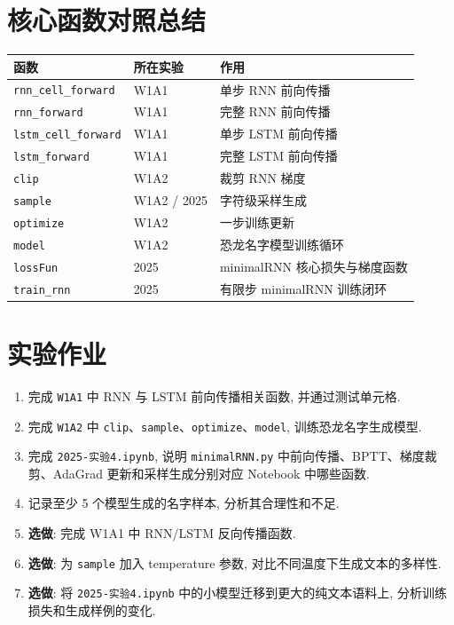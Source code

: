 \documentclass{../../nndlcourse}
\begin{document}
\section{核心函数对照总结}

\begin{center}
\begin{tabular}{|l|l|l|}
\hline
\textbf{函数} & \textbf{所在实验} & \textbf{作用} \\
\hline
\texttt{rnn\_cell\_forward} & W1A1 & 单步 RNN 前向传播 \\
\texttt{rnn\_forward} & W1A1 & 完整 RNN 前向传播 \\
\texttt{lstm\_cell\_forward} & W1A1 & 单步 LSTM 前向传播 \\
\texttt{lstm\_forward} & W1A1 & 完整 LSTM 前向传播 \\
\texttt{clip} & W1A2 & 裁剪 RNN 梯度 \\
\texttt{sample} & W1A2 / 2025 & 字符级采样生成 \\
\texttt{optimize} & W1A2 & 一步训练更新 \\
\texttt{model} & W1A2 & 恐龙名字模型训练循环 \\
\texttt{lossFun} & 2025 & minimalRNN 核心损失与梯度函数 \\
\texttt{train\_rnn} & 2025 & 有限步 minimalRNN 训练闭环 \\
\hline
\end{tabular}
\end{center}


\section{实验作业}
\begin{enumerate}
    \item 完成 \texttt{W1A1} 中 RNN 与 LSTM 前向传播相关函数, 并通过测试单元格.
    \item 完成 \texttt{W1A2} 中 \texttt{clip}、\texttt{sample}、\texttt{optimize}、\texttt{model}, 训练恐龙名字生成模型.
    \item 完成 \texttt{2025-实验4.ipynb}, 说明 \texttt{minimalRNN.py} 中前向传播、BPTT、梯度裁剪、AdaGrad 更新和采样生成分别对应 Notebook 中哪些函数.
    \item 记录至少 5 个模型生成的名字样本, 分析其合理性和不足.
    \item \textbf{选做}: 完成 W1A1 中 RNN/LSTM 反向传播函数.
    \item \textbf{选做}: 为 \texttt{sample} 加入 temperature 参数, 对比不同温度下生成文本的多样性.
    \item \textbf{选做}: 将 \texttt{2025-实验4.ipynb} 中的小模型迁移到更大的纯文本语料上, 分析训练损失和生成样例的变化.
\end{enumerate}
\end{document}
